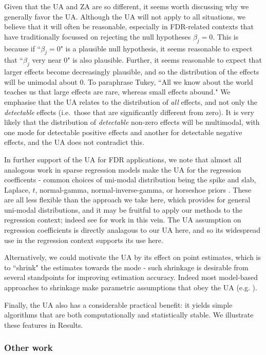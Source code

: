 Given that the UA and ZA are so different, it seems worth discussing why we generally favor the UA. 
Although the UA will not apply to all situations, we believe that it will often be reasonable, especially in FDR-related contexts
that have traditionally focussed on rejecting the null hypotheses $\beta_j=0$. This is because if ``$\beta_j=0$" is a plausible null hypothesis,  
it seems reasonable to expect that ``$\beta_j$ very near 0" is also plausible. Further, it seems reasonable to expect that larger effects become
decreasingly plausible, and so the distribution of the effects will be unimodal about 0. To paraphrase Tukey, ``All we know about the world teaches us that large effects are rare, whereas small effects abound."
We emphasise that the UA relates to the distribution of {\it all} effects, and not only the {\it detectable} effects (i.e.~those that are significantly different from zero). It is very likely that the distribution of {\it detectable} non-zero effects will be multimodal, with one mode for detectable positive effects and another for detectable negative effects, and the UA does not contradict this.

In further support of the UA for FDR applications, we note that almost all analogous work in sparse regression models make the UA for the regression coefficents - 
common choices of uni-modal distribution being the spike and slab, Laplace, $t$, normal-gamma, normal-inverse-gamma, or horseshoe priors \cite{carvalho2010horseshoe}.
These are all less flexible than the approach we take here, which provides for general uni-modal distributions, and 
it may be fruitful to apply our methods to the regression context; indeed see \cite{moser:2015} for work in this vein. 
The UA assumption on regression coefficients is directly analagous to our UA here, and so its
widespread use in the regression context supports its use here.

Alternatively, we could motivate the UA by its effect on point estimates, which is to ``shrink" the estimates towards the mode - 
such shrinkage is desirable from several standpoints for improving estimation accuracy. Indeed most model-based approaches to shrinkage
make parametric assumptions that obey the UA (e.g. \cite{johnstone2004needles}).

Finally, the UA also has a considerable practical benefit: it yields simple algorithms that are both computationally
and statistically stable. We illustrate these features in Results.

\subsubsection*{Other work}

